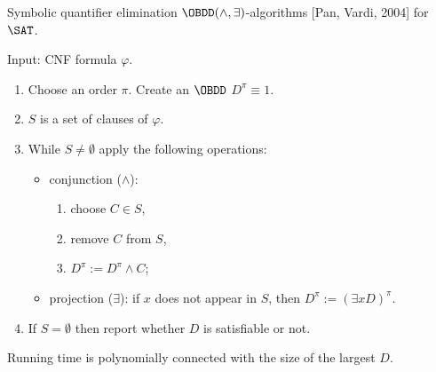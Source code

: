 \begin{frame}{Symbolic quantifier elimination}
	$\OBDD(\land, \exists)$-algorithms [Pan, Vardi, 2004] for $\SAT$.

    \vspace{0.3cm}
    \pause

    Input: CNF formula $\varphi$.
    \begin{enumerate}
        \item Choose an order $\pi$. Create an $\OBDD$ $D^{\pi} \equiv 1$.
        \item $S$ is a set of clauses of $\varphi$.
        \pause
        \item While $S \neq \emptyset$ apply the following operations:
            \begin{itemize}
                \item conjunction ($\land$):
                    \begin{enumerate}
                        \item choose $C \in S$,
                        \item remove $C$ from $S$,
                        \item $D^{\pi} := D^{\pi} \land C$;
                    \end{enumerate}
                \pause
                \item projection ($\exists$): if $x$ does not appear in $S$, then $D^{\pi} := (\exists x
                    D)^{\pi}$.
                \pause
            \end{itemize}
        \item If $S = \emptyset$ then report whether $D$ is satisfiable or not.
    \end{enumerate}

    Running time is polynomially connected with the size of the largest $D$.    
\end{frame}


